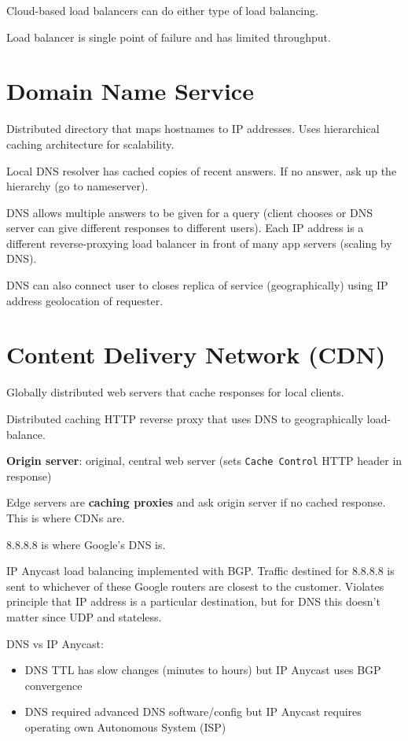 \documentclass[11pt]{article}
\begin{document}
Cloud-based load balancers can do either type of load balancing.

Load balancer is single point of failure and has limited throughput.
\section{Domain Name Service}
\label{sec:org99e9e3d}
Distributed directory that maps hostnames to IP addresses.
Uses hierarchical caching architecture for scalability.

Local DNS resolver has cached copies of recent answers.
If no answer, ask up the hierarchy (go to nameserver).

DNS allows multiple answers to be given for a query (client chooses or DNS server can give different
responses to different users).
Each IP address is a different reverse-proxying load balancer in front of many app servers (scaling
by DNS).

DNS can also connect user to closes replica of service (geographically) using IP address geolocation
of requester.
\section{Content Delivery Network (CDN)}
\label{sec:orge76361a}
Globally distributed web servers that cache responses for local clients.

Distributed caching HTTP reverse proxy that uses DNS to geographically load-balance.

\textbf{Origin server}: original, central web server (sets \texttt{Cache Control} HTTP header in response)

Edge servers are \textbf{caching proxies} and ask origin server if no cached response.
This is where CDNs are.

8.8.8.8 is where Google's DNS is.

IP Anycast load balancing implemented with BGP.
Traffic destined for 8.8.8.8 is sent to whichever of these Google routers are closest to the customer.
Violates principle that IP address is a particular destination, but for DNS this doesn't matter since
UDP and stateless.

DNS vs IP Anycast:
\begin{itemize}
\item DNS TTL has slow changes (minutes to hours) but IP Anycast uses BGP convergence
\item DNS required advanced DNS software/config but IP Anycast requires operating own Autonomous System (ISP)
\end{itemize}
\end{document}
